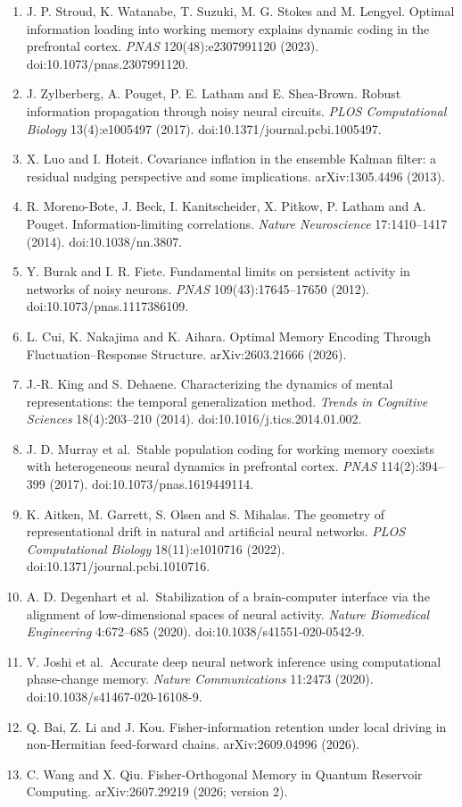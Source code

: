 \documentclass[
  10pt,
]{article}
\begin{document}
\begin{enumerate}
  \emph{New Journal of Physics} 14:013063 (2012).
  doi:10.1088/1367-2630/14/1/013063.
\item
  J. P. Stroud, K. Watanabe, T. Suzuki, M. G. Stokes and M. Lengyel.
  Optimal information loading into working memory explains dynamic
  coding in the prefrontal cortex. \emph{PNAS} 120(48):e2307991120
  (2023). doi:10.1073/pnas.2307991120.
\item
  J. Zylberberg, A. Pouget, P. E. Latham and E. Shea-Brown. Robust
  information propagation through noisy neural circuits. \emph{PLOS
  Computational Biology} 13(4):e1005497 (2017).
  doi:10.1371/journal.pcbi.1005497.
\item
  X. Luo and I. Hoteit. Covariance inflation in the ensemble Kalman
  filter: a residual nudging perspective and some implications.
  arXiv:1305.4496 (2013).
\item
  R. Moreno-Bote, J. Beck, I. Kanitscheider, X. Pitkow, P. Latham and A.
  Pouget. Information-limiting correlations. \emph{Nature Neuroscience}
  17:1410--1417 (2014). doi:10.1038/nn.3807.
\item
  Y. Burak and I. R. Fiete. Fundamental limits on persistent activity in
  networks of noisy neurons. \emph{PNAS} 109(43):17645--17650 (2012).
  doi:10.1073/pnas.1117386109.
\item
  L. Cui, K. Nakajima and K. Aihara. Optimal Memory Encoding Through
  Fluctuation--Response Structure. arXiv:2603.21666 (2026).
\item
  J.-R. King and S. Dehaene. Characterizing the dynamics of mental
  representations: the temporal generalization method. \emph{Trends in
  Cognitive Sciences} 18(4):203--210 (2014).
  doi:10.1016/j.tics.2014.01.002.
\item
  J. D. Murray et al.~Stable population coding for working memory
  coexists with heterogeneous neural dynamics in prefrontal cortex.
  \emph{PNAS} 114(2):394--399 (2017). doi:10.1073/pnas.1619449114.
\item
  K. Aitken, M. Garrett, S. Olsen and S. Mihalas. The geometry of
  representational drift in natural and artificial neural networks.
  \emph{PLOS Computational Biology} 18(11):e1010716 (2022).
  doi:10.1371/journal.pcbi.1010716.
\item
  A. D. Degenhart et al.~Stabilization of a brain-computer interface via
  the alignment of low-dimensional spaces of neural activity.
  \emph{Nature Biomedical Engineering} 4:672--685 (2020).
  doi:10.1038/s41551-020-0542-9.
\item
  V. Joshi et al.~Accurate deep neural network inference using
  computational phase-change memory. \emph{Nature Communications}
  11:2473 (2020). doi:10.1038/s41467-020-16108-9.
\item
  Q. Bai, Z. Li and J. Kou. Fisher-information retention under local
  driving in non-Hermitian feed-forward chains. arXiv:2609.04996 (2026).
\item
  C. Wang and X. Qiu. Fisher-Orthogonal Memory in Quantum Reservoir
  Computing. arXiv:2607.29219 (2026; version 2).
\end{enumerate}
\end{document}
